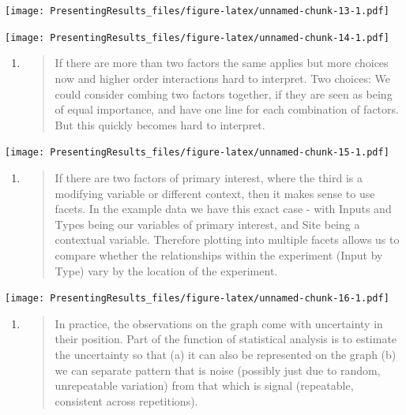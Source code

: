 \documentclass[
]{book}
\begin{document}
\texttt{[image: PresentingResults\_files/figure-latex/unnamed-chunk-13-1.pdf]}

\texttt{[image: PresentingResults\_files/figure-latex/unnamed-chunk-14-1.pdf]}

\begin{enumerate}
\def\labelenumi{\arabic{enumi}.}
\setcounter{enumi}{4}
\item
  \begin{quote}
  If there are more than two factors the same applies but more choices now and higher order interactions hard to interpret. Two choices:
  We could consider combing two factors together, if they are seen as being of equal importance, and have one line for each combination of factors. But this quickly becomes hard to interpret.
  \end{quote}
\end{enumerate}

\texttt{[image: PresentingResults\_files/figure-latex/unnamed-chunk-15-1.pdf]}

\begin{enumerate}
\def\labelenumi{\arabic{enumi}.}
\setcounter{enumi}{5}
\item
  \begin{quote}
  If there are two factors of primary interest, where the third is a modifying variable or different context, then it makes sense to use facets. In the example data we have this exact case - with Inputs and Types being our variables of primary interest, and Site being a contextual variable. Therefore plotting into multiple facets allows us to compare whether the relationships within the experiment (Input by Type) vary by the location of the experiment.
  \end{quote}
\end{enumerate}

\texttt{[image: PresentingResults\_files/figure-latex/unnamed-chunk-16-1.pdf]}

\begin{enumerate}
\def\labelenumi{\arabic{enumi}.}
\setcounter{enumi}{6}
\item
  \begin{quote}
  In practice, the observations on the graph come with uncertainty in their position. Part of the function of statistical analysis is to estimate the uncertainty so that (a) it can also be represented on the graph (b) we can separate pattern that is noise (possibly just due to random, unrepeatable variation) from that which is signal (repeatable, consistent across repetitions).
  \end{quote}
\end{enumerate}
\end{document}
